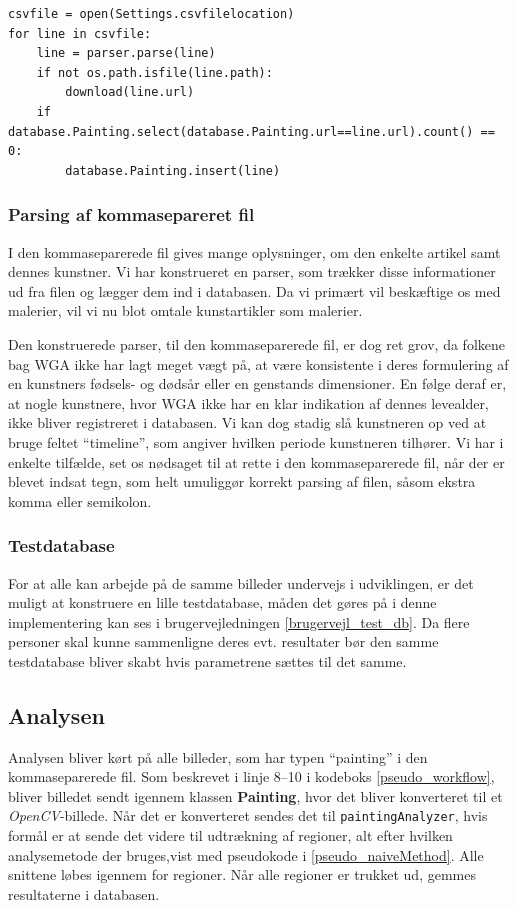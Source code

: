{\begin{lstlisting}[caption={Pseudokode for database
    initialisering},frame=tb,label={pseudo_init_db}, captionpos=b,
    float=h]
csvfile = open(Settings.csvfilelocation)
for line in csvfile:
	line = parser.parse(line)
	if not os.path.isfile(line.path):
		download(line.url)
	if database.Painting.select(database.Painting.url==line.url).count() == 0:
		database.Painting.insert(line)
\end{lstlisting}

\subsubsection{Parsing af kommasepareret fil}
I den kommaseparerede fil gives mange oplysninger, om den enkelte
artikel samt dennes kunstner.  Vi har konstrueret en parser, som trækker
disse informationer ud fra filen og lægger dem ind i databasen. Da vi
primært vil beskæftige os med malerier, vil vi nu blot omtale
kunstartikler som malerier.

Den konstruerede parser, til den kommaseparerede fil, er dog ret grov,
da folkene bag WGA ikke har lagt meget vægt på, at være konsistente i
deres formulering af en kunstners fødsels- og dødsår eller en genstands
dimensioner. En følge deraf er, at nogle kunstnere, hvor WGA ikke har en
klar indikation af dennes levealder, ikke bliver registreret i
databasen. Vi kan dog stadig slå kunstneren op ved at bruge feltet
``timeline'', som angiver hvilken periode kunstneren tilhører. Vi har i
enkelte tilfælde, set os nødsaget til at rette i den kommaseparerede
fil, når der er blevet indsat tegn, som helt umuliggør korrekt parsing
af filen, såsom ekstra komma eller semikolon.

\subsubsection{Testdatabase}\label{test_db}
For at alle kan arbejde på de samme billeder undervejs i udviklingen, er
det muligt at konstruere en lille testdatabase, måden det gøres på i
denne implementering kan ses i brugervejledningen
\ref{brugervejl_test_db}. Da flere personer skal
kunne sammenligne deres evt. resultater bør den samme testdatabase
bliver skabt hvis parametrene sættes til det samme.

\subsection{Analysen}
Analysen bliver kørt på alle billeder, som har typen ``painting'' i den
kommaseparerede fil. Som beskrevet i linje 8--10 i kodeboks
\ref{pseudo_workflow}, bliver billedet sendt igennem klassen
\textbf{Painting}, hvor det bliver konverteret til et
\emph{OpenCV}-billede. Når det er konverteret sendes det til
\texttt{paintingAnalyzer}, hvis formål er at sende det videre til
udtrækning af regioner, alt efter hvilken analysemetode der bruges,vist
med pseudokode i \ref{pseudo_naiveMethod}. Alle snittene løbes igennem
for regioner.
Når alle regioner er trukket ud, gemmes resultaterne i databasen.

}
